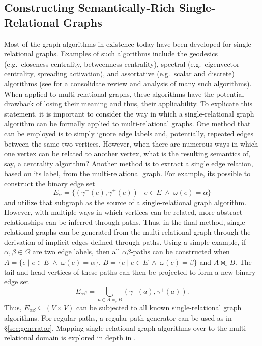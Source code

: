 \documentclass[10pt,conference,letterpaper]{IEEEtran}
\newcommand{\join}{\bowtie_\circ}
\begin{document}
\subsection{Constructing Semantically-Rich Single-Relational Graphs\label{sec:rich}}

Most of the graph algorithms in existence today have been developed for single-relational graphs. Examples of such algorithms include the geodesics (e.g.~closeness centrality, betweenness centrality), spectral (e.g.~eigenvector centrality, spreading activation), and assortative (e.g.~scalar and discrete) algorithms (see \cite{netanal:brandes2005} for a consolidate review and analysis of many such algorithms). When applied to multi-relational graphs, these algorithms have the potential drawback of losing their meaning and thus, their applicability. To explicate this statement, it is important to consider the way in which a single-relational graph algorithm can be formally applied to multi-relational graphs. One method that can be employed is to simply ignore edge labels and, potentially, repeated edges between the same two vertices. However, when there are numerous ways in which one vertex can be related to another vertex, what is the resulting semantics of, say, a centrality algorithm? Another method is to extract a single edge relation, based on its label, from the multi-relational graph. For example, its possible to construct the binary edge set
\begin{equation*}
E_\alpha = \{ (\gamma^-(e),\gamma^+(e)) \; | \; e \in E \; \wedge \; \omega(e) = \alpha \}
\end{equation*}
and utilize that subgraph as the source of a single-relational graph algorithm. However, with multiple ways in which vertices can be related, more abstract relationships can be inferred through paths. Thus, in the final method, single-relational graphs can be generated from the multi-relational graph through the derivation of implicit edges defined through paths. Using a simple example, if $\alpha,\beta \in \Omega$ are two edge labels, then all $\alpha\beta$-paths can be constructed when $A = \{ e \; | \; e \in E \; \wedge \; \omega(e) = \alpha \}$, $B = \{ e \; | \; e \in E \; \wedge \; \omega(e) = \beta \}$ and $A \join B$. The tail and head vertices of these paths can then be projected to form a new binary edge set
\begin{equation*}
E_{\alpha\beta} = \bigcup_{a \in A \join B} \left(\gamma^-(a), \gamma^+(a)\right).
\end{equation*}
Thus, $E_{\alpha\beta} \subseteq (V \times V)$ can be subjected to all known single-relational graph algorithms. For regular paths, a regular path generator can be used as in \S \ref{sec:generator}. Mapping single-relational graph algorithms over to the multi-relational domain is explored in depth in \cite{pathalg:rodriguez2009}.
\end{document}
